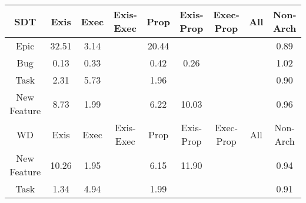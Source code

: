 \begin{tabular}{|c||c|c|c|c|c|c|c|c|}
\hline
\hline
SDT & Exis & Exec & Exis-Exec & Prop & Exis-Prop & Exec-Prop & All & Non-Arch \\ 
\hline
Epic & \cellcolor[rgb]{0.7851898253104701,0.7808793909365384,0.41999999999999993} 32.51 & \cellcolor[rgb]{0.9015149009286972,0.8359807425451723,0.42} 3.14 &  & \cellcolor[rgb]{0.8330013792702331,0.803526969128005,0.42} 20.44 &  &  &  & \cellcolor[rgb]{0.8924721467075684,0.7570348277491572,0.4036406702603972} 0.89 \\ 
\hline
Bug & \cellcolor[rgb]{0.7744806314372987,0.19854165546988067,0.2935152560081455} 0.13 & \cellcolor[rgb]{0.8058115209137591,0.3468411989917927,0.3227574195195084} 0.33 &  & \cellcolor[rgb]{0.8196951030200658,0.4125568209616445,0.3357154294853947} 0.42 & \cellcolor[rgb]{0.7947667305018595,0.29456252437546804,0.31244894846840215} 0.26 &  &  & \cellcolor[rgb]{0.9099388327902718,0.8399710260585497,0.42} 1.02 \\ 
\hline
Task & \cellcolor[rgb]{0.9048155975240945,0.83754423040615,0.42} 2.31 & \cellcolor[rgb]{0.891266473951943,0.8311262245035519,0.42} 5.73 &  & \cellcolor[rgb]{0.9062077756812803,0.8382036832174485,0.42} 1.96 &  &  &  & \cellcolor[rgb]{0.8945147552165817,0.76670317469182,0.40554710486880957} 0.90 \\ 
\hline
New Feature & \cellcolor[rgb]{0.8793833935332851,0.8254973969368191,0.41999999999999993} 8.73 & \cellcolor[rgb]{0.9060953590946842,0.8381504332553766,0.42} 1.99 &  & \cellcolor[rgb]{0.8893072297348051,0.8301981614533287,0.42} 6.22 & \cellcolor[rgb]{0.8742410976334216,0.8230615725631997,0.42} 10.03 &  &  & \cellcolor[rgb]{0.9041112695820621,0.8121266760217605,0.4145038516099246} 0.96 \\ 
\hline
\hline
WD & Exis & Exec & Exis-Exec & Prop & Exis-Prop & Exec-Prop & All & Non-Arch \\ 
\hline
New Feature & \cellcolor[rgb]{0.8733276347342382,0.8226288796109549,0.41999999999999993} 10.26 & \cellcolor[rgb]{0.9062375726375913,0.8382177975651749,0.42} 1.95 &  & \cellcolor[rgb]{0.8896190848949223,0.8303458823186474,0.42} 6.15 & \cellcolor[rgb]{0.8668351455389636,0.8195534899921406,0.42} 11.90 &  &  & \cellcolor[rgb]{0.9011866755200246,0.7982835974614496,0.4117742304853563} 0.94 \\ 
\hline
Task & \cellcolor[rgb]{0.9086407498519551,0.8393561446667156,0.42} 1.34 & \cellcolor[rgb]{0.894411866217899,0.8326161471558469,0.42} 4.94 &  & \cellcolor[rgb]{0.9060667084586926,0.838136861901486,0.42} 1.99 &  &  &  & \cellcolor[rgb]{0.8954437442984516,0.7711003896793375,0.40641416134522146} 0.91 \\ 

\end{tabular}
